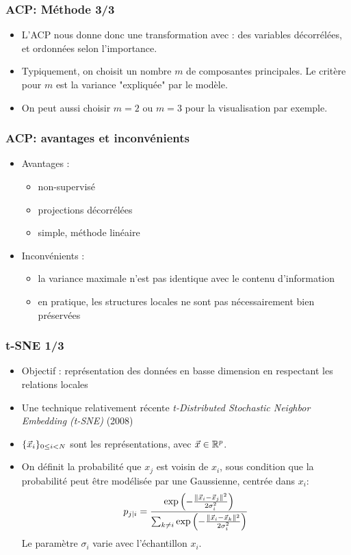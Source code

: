 \begin{frame}
\frametitle{ACP: Méthode 3/3}
  \begin{itemize}
  	\item L'ACP nous donne donc une transformation avec : des variables décorrélées, et ordonnées selon l'importance. 
  	\item Typiquement, on choisit un nombre $m$ de composantes principales. Le critère pour $m$ est la variance "expliquée" par le modèle. 
  	\item On peut aussi choisir $m=2$ ou $m=3$ pour la visualisation par exemple.   
  \end{itemize}
\end{frame}

\begin{frame}
\frametitle{ACP: avantages et inconvénients}
  \begin{itemize}
  	\item Avantages : 
  	\begin{itemize}
  		\item non-supervisé
  		\item projections décorrélées 
  		\item simple, méthode linéaire
  	\end{itemize}
  	\item Inconvénients : 
  	\begin{itemize}
  		\item la variance maximale n'est pas identique avec le contenu d'information
  		\item en pratique, les structures locales ne sont pas nécessairement bien préservées 
  	\end{itemize}
  \end{itemize}
\end{frame}

\begin{frame}
\frametitle{t-SNE 1/3}
\begin{itemize}
	\item Objectif : représentation des données en basse dimension en respectant les relations locales
	\item Une technique relativement récente  \emph{t-Distributed Stochastic Neighbor Embedding (t-SNE)} (2008)
	\item $\{\vec{x}_i\}_{0\leq i < N}$ sont les représentations, avec $\vec{x} \in {\mathbb R}^p$. 
	\item On définit la probabilité que $x_j$ est voisin de $x_i$, sous condition que la probabilité peut être modélisée par une Gaussienne, centrée dans $x_i$:  
	\begin{equation}
	p_{j|i} = \frac{\exp{\left(-\frac{\|\vec{x}_i - \vec{x}_j\|^2}{2 \sigma_i^2}\right)}}{\sum_{k\neq i} \exp{\left(-\frac{\|\vec{x}_i - \vec{x}_k\|^2}{2 \sigma_i^2}\right)} }
	\end{equation}
	Le paramètre $\sigma_i$ varie avec l'échantillon $x_i$. 
\end{itemize}
\end{frame}


